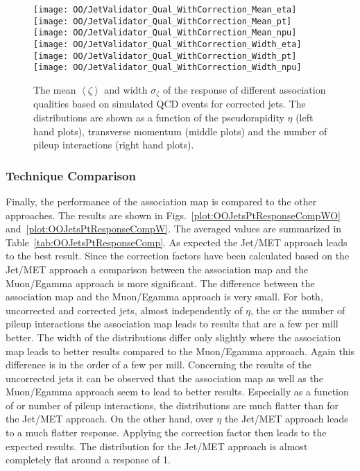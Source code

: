 \begin{figure}[Ht]
  \centering
  \texttt{[image: OO/JetValidator\_Qual\_WithCorrection\_Mean\_eta]}
  \texttt{[image: OO/JetValidator\_Qual\_WithCorrection\_Mean\_pt]}
  \texttt{[image: OO/JetValidator\_Qual\_WithCorrection\_Mean\_npu]}
  \\
  \texttt{[image: OO/JetValidator\_Qual\_WithCorrection\_Width\_eta]}
  \texttt{[image: OO/JetValidator\_Qual\_WithCorrection\_Width\_pt]}
  \texttt{[image: OO/JetValidator\_Qual\_WithCorrection\_Width\_npu]}
  \caption[Mean and width of the \pt{} response of different association qualities based on simulated QCD events for corrected jets]{The mean $\left<\zeta\right>$ and width $\sigma_{\zeta}$ of the \pt{} response of different association qualities based on simulated QCD events for corrected jets. The distributions are shown as a function of the pseudorapidity $\eta$ (left hand plots), transverse momentum (middle plots) and the number of pileup interactions (right hand plots). \label{plot:OOJetsPtResponseQualW}}
\end{figure}

\subsubsection{Technique Comparison \label{sec:OOJetsPtResponseComp} }

Finally, the performance of the association map is compared to the other approaches. The results are shown in Figs.~\ref{plot:OOJetsPtResponseCompWO} and~\ref{plot:OOJetsPtResponseCompW}. The averaged values are summarized in Table~\ref{tab:OOJetsPtResponseComp}. As expected the Jet/MET approach leads to the best result. Since the correction factors have been calculated based on the Jet/MET approach a comparison between the association map and the Muon/Egamma approach is more significant. The difference between the association map and the Muon/Egamma approach is very small. For both, uncorrected and corrected jets, almost independently of $\eta$, the \pt or the number of pileup interactions the association map leads to results that are a few per mill better. The width of the distributions differ only slightly where the association map leads to better results compared to the Muon/Egamma approach. Again this difference is in the order of a few per mill. Concerning the results of the uncorrected jets it can be observed that the association map as well as the Muon/Egamma approach seem to lead to better results. Especially as a function of \pt or number of pileup interactions, the distributions are much flatter than for the Jet/MET approach. On the other hand, over $\eta$ the Jet/MET approach leads to a much flatter \pt{} response. Applying the correction factor then leads to the expected results. The distribution for the Jet/MET approach is almost completely flat around a \pt{} response of 1.

